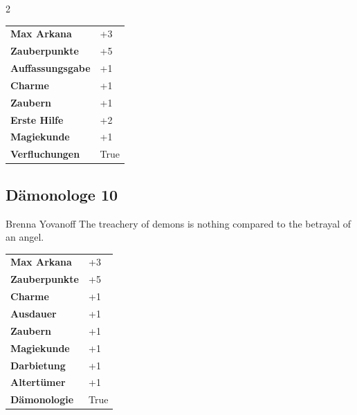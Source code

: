 \begin{multicols}{2}
\begin{tcolorbox}
\vspace{3mm}

\begin{tabular}{@{}ll@{}}
    \textbf{Max Arkana} & +3\\
    \textbf{Zauberpunkte} & +5\\
    \textbf{Auffassungsgabe} & +1\\
    \textbf{Charme} & +1\\
    \textbf{Zaubern} & +1\\
    \textbf{Erste Hilfe} & +2\\
    \textbf{Magiekunde} & +1\\
    \textbf{Verfluchungen} & True\\
\end{tabular}


\end{tcolorbox}

\begin{tcolorbox}
    \subsection*{Dämonologe \hfill \small{10 }}
    \tcblower


\begin{pquote}{Brenna Yovanoff}
The treachery of demons is nothing compared to the betrayal of an angel.
\end{pquote}

\vspace{3mm}

\begin{tabular}{@{}ll@{}}
    \textbf{Max Arkana} & +3\\
    \textbf{Zauberpunkte} & +5\\
    \textbf{Charme} & +1\\
    \textbf{Ausdauer} & +1\\
    \textbf{Zaubern} & +1\\
    \textbf{Magiekunde} & +1\\
    \textbf{Darbietung} & +1\\
    \textbf{Altertümer} & +1\\
    \textbf{Dämonologie} & True\\
\end{tabular}



\end{tcolorbox}
\end{multicols}
